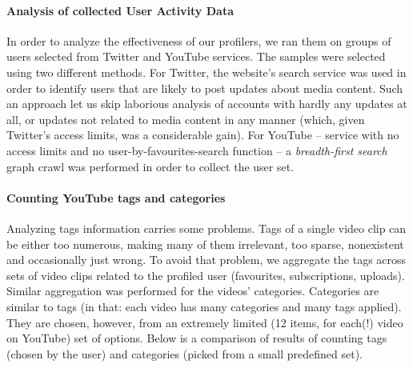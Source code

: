 \paragraph{Analysis of collected User Activity Data}
In order to analyze the effectiveness of our profilers, we ran them on groups of
users selected from Twitter and YouTube services. The samples were selected
using two different methods. For Twitter, the website's search service was used
in order to identify users that are likely to post updates about media content.
Such an approach let us skip laborious analysis of accounts with hardly any
updates at all, or updates not related to media content in any manner (which,
given Twitter's access limits, was a considerable gain). For YouTube -- service
with no access limits and no user-by-favourites-search function -- a \textit{breadth-first search}
graph crawl was performed in order to collect the user set.

\paragraph{Counting YouTube tags and categories}
Analyzing tags information carries some problems. Tags of a single video clip
can be either too numerous, making many
of them irrelevant, too sparse, nonexistent and occasionally just wrong. To avoid
that problem, we aggregate the tags across sets of video clips related to the
profiled user (favourites, subscriptions, uploads). Similar aggregation was
performed for the videos' categories. Categories are similar to tags (in that:
each video has many categories and many tags applied). They are chosen,
however, from an extremely limited (12 items, for each(!) video on YouTube) set
of options.  Below is a comparison of results of counting
tags (chosen by the user) and categories (picked from a small predefined set).


